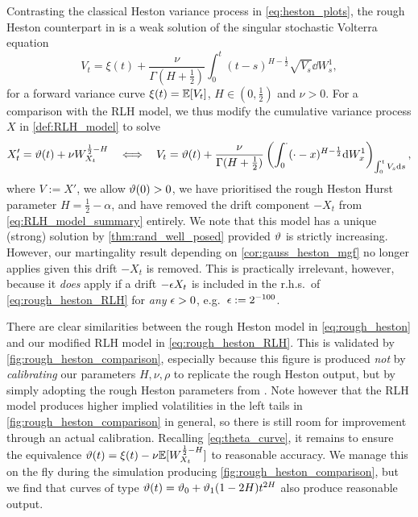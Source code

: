 Contrasting the classical Heston variance process in \autoref{eq:heston_plots}, the rough Heston counterpart in \cite{eleuch_2019b} is a weak solution of the singular stochastic Volterra equation~
\begin{equation}\label{eq:rough_heston}
    V_t = \xi(t) + \frac{\nu}{\Gamma(H+\frac12)}\int_0^t(t-s)^{H-\frac12}\sqrt{V_s}\dd W^1_s,
\end{equation}
for a forward variance curve $\xi(t)=\mathbb{E}[V_t]$, $H\in(0,\frac12)$ and $\nu>0$. For a comparison with the RLH model, we thus modify the cumulative variance process $X$ in \autoref{def:RLH_model} to solve
\begin{equation}\label{eq:rough_heston_RLH}
    X'_t = \vartheta(t) + \nu W^{\frac12-H}_{X_t}\ \  \iff\ \  V_t = \vartheta(t) + \frac{\nu}{\Gamma(H+\frac12)}\left(\int_0^{\cdot}(\cdot-x)^{H-\frac12}\mathrm{d} W^1_x\right)_{\int_0^t V_s\mathrm{d} s},
\end{equation}
where $V:=X'$, we allow $\vartheta(0)>0$, we have prioritised the rough Heston Hurst parameter $H=\frac12-\alpha$, and have removed the drift component $-X_t$ from \autoref{eq:RLH_model_summary} entirely. We note that this model has a unique (strong) solution by \autoref{thm:rand_well_posed} provided $\vartheta$ is strictly increasing. However, our martingality result depending on \autoref{cor:gauss_heston_mgf} no longer applies given this drift $-X_t$ is removed. This is practically irrelevant, however, because it \emph{does} apply if a drift $-\epsilon X_t$ is included in the r.h.s.~of \autoref{eq:rough_heston_RLH} for \emph{any} $\epsilon>0$, e.g.~$\epsilon:=2^{-100}$.

There are clear similarities between the rough Heston model in \autoref{eq:rough_heston} and our modified RLH model in \autoref{eq:rough_heston_RLH}. This is validated by \autoref{fig:rough_heston_comparison}, especially because this figure is produced \emph{not} by \emph{calibrating} our parameters $H,\nu,\rho$ to replicate the rough Heston output, but by simply adopting the rough Heston parameters from \cite{eleuch_2019b}. Note however that the RLH model produces higher implied volatilities in the left tails in \autoref{fig:rough_heston_comparison} in general, so there is still room for improvement through an actual calibration. Recalling \autoref{eq:theta_curve}, it remains to ensure the equivalence $\vartheta(t)=\xi(t) - \nu\mathbb{E}[W^{\frac12-H}_{X_t}]$ to reasonable accuracy. We manage this on the fly during the simulation producing \autoref{fig:rough_heston_comparison}, but we find that curves of type $\vartheta(t)=\vartheta_0+\vartheta_1(1-2H)t^{2H}$ also produce reasonable output.

